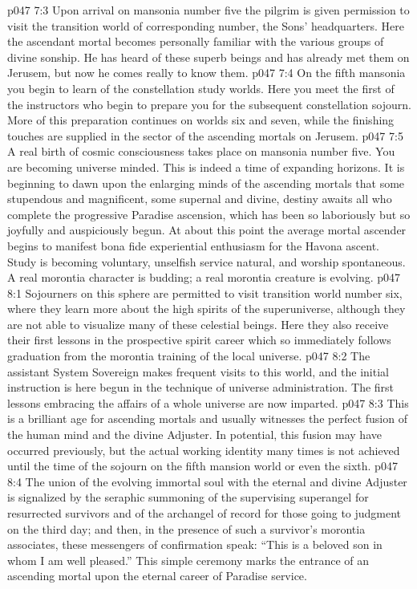 \vs p047 7:3 Upon arrival on mansonia number five the pilgrim is given permission to visit the transition world of corresponding number, the Sons’ headquarters. Here the ascendant mortal becomes personally familiar with the various groups of divine sonship. He has heard of these superb beings and has already met them on Jerusem, but now he comes really to know them.
\vs p047 7:4 On the fifth mansonia you begin to learn of the constellation study worlds. Here you meet the first of the instructors who begin to prepare you for the subsequent constellation sojourn. More of this preparation continues on worlds six and seven, while the finishing touches are supplied in the sector of the ascending mortals on Jerusem.
\vs p047 7:5 A real birth of cosmic consciousness takes place on mansonia number five. You are becoming universe minded. This is indeed a time of expanding horizons. It is beginning to dawn upon the enlarging minds of the ascending mortals that some stupendous and magnificent, some supernal and divine, destiny awaits all who complete the progressive Paradise ascension, which has been so laboriously but so joyfully and auspiciously begun. At about this point the average mortal ascender begins to manifest bona fide experiential enthusiasm for the Havona ascent. Study is becoming voluntary, unselfish service natural, and worship spontaneous. A real morontia character is budding; a real morontia creature is evolving.
\vs p047 8:1 Sojourners on this sphere are permitted to visit transition world number six, where they learn more about the high spirits of the superuniverse, although they are not able to visualize many of these celestial beings. Here they also receive their first lessons in the prospective spirit career which so immediately follows graduation from the morontia training of the local universe.
\vs p047 8:2 The assistant System Sovereign makes frequent visits to this world, and the initial instruction is here begun in the technique of universe administration. The first lessons embracing the affairs of a whole universe are now imparted.
\vs p047 8:3 \pc This is a brilliant age for ascending mortals and usually witnesses the perfect fusion of the human mind and the divine Adjuster. In potential, this fusion may have occurred previously, but the actual working identity many times is not achieved until the time of the sojourn on the fifth mansion world or even the sixth.
\vs p047 8:4 \pc The union of the evolving immortal soul with the eternal and divine Adjuster is signalized by the seraphic summoning of the supervising superangel for resurrected survivors and of the archangel of record for those going to judgment on the third day; and then, in the presence of such a survivor’s morontia associates, these messengers of confirmation speak: “This is a beloved son in whom I am well pleased.” This simple ceremony marks the entrance of an ascending mortal upon the eternal career of Paradise service.
